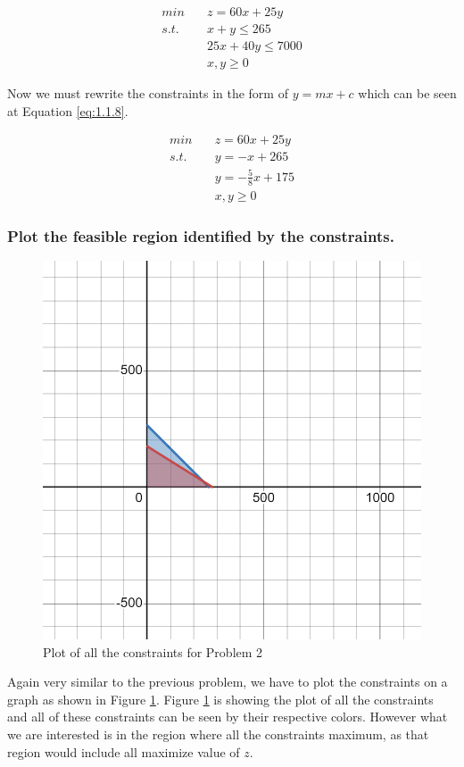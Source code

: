 \documentclass[unicode,11pt,a4paper,oneside,numbers=endperiod,openany]{scrartcl}
\begin{document}
\begin{equation}
	\begin{aligned}
		min \quad  & z = 60x + 25y       \\
		s.t. \quad & x + y \leq 265      \\
		           & 25x + 40y \leq 7000 \\
		           & x, y \geq 0
	\end{aligned}
	\label{eq:1.1.7}
\end{equation}

Now we must rewrite the constraints in the form of $y = mx + c$ which can be seen at Equation \ref{eq:1.1.8}.

\begin{equation}
	\begin{aligned}
		min \quad  & z = 60x + 25y           \\
		s.t. \quad & y = -x + 265            \\
		           & y = -\frac{5}{8}x + 175 \\
		           & x, y \geq 0
	\end{aligned}
	\label{eq:1.1.8}
\end{equation}

\subsubsection{Plot the feasible region identiﬁed by the constraints.}

\begin{figure}[H]
	\centering
	\includegraphics[width=0.5\linewidth]{figures/problem_1.2.1.png}
	\caption{Plot of all the constraints for Problem 2}
	\label{fig:problem_2.1}
\end{figure}

Again very similar to the previous problem, we have to plot the constraints on a graph as shown in Figure \ref{fig:problem_2.1}. Figure \ref{fig:problem_2.1} is showing the plot of all the constraints and all of these constraints can be seen by their respective colors. However what we are interested is in the region where all the constraints maximum, as that region would include all maximize value of $z$.
\end{document}
